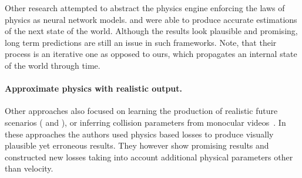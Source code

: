 Other research attempted to abstract the physics engine enforcing the laws of physics as neural network models. 
\cite{battaglia2016interaction} and \cite{chang2016compositional} were able to produce accurate estimations of the next state of the world. Although the results look plausible and promising, long term predictions are still an issue in such frameworks. Note, that their process is an iterative one as opposed to ours, which propagates an internal state of the world through time.

\paragraph{Approximate physics with realistic output.}
Other approaches also focused on learning the production of realistic future scenarios (\cite{CNNFluid2016} and \cite{jeong2015data}), or inferring collision parameters from monocular videos~\cite{MonszpartEtAl:SMASH:2016}. In these approaches the authors used physics based losses to produce visually plausible yet erroneous results. They however show promising results and constructed new losses taking into account additional physical parameters other than velocity.





